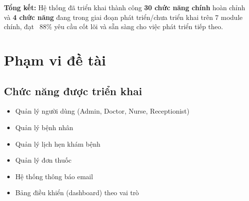 \documentclass[12pt,a4paper]{report}
\begin{document}
\textbf{Tổng kết:} Hệ thống đã triển khai thành công \textbf{30 chức năng chính} hoàn chỉnh và \textbf{4 chức năng} đang trong giai đoạn phát triển/chưa triển khai trên 7 module chính, đạt ~88\% yêu cầu cốt lõi và sẵn sàng cho việc phát triển tiếp theo.

\section{Phạm vi đề tài}
\subsection{Chức năng được triển khai}
\begin{itemize}
    \item Quản lý người dùng (Admin, Doctor, Nurse, Receptionist)
    \item Quản lý bệnh nhân
    \item Quản lý lịch hẹn khám bệnh
    \item Quản lý đơn thuốc
    \item Hệ thống thông báo email
    \item Bảng điều khiển (dashboard) theo vai trò
\end{itemize}
\end{document}
